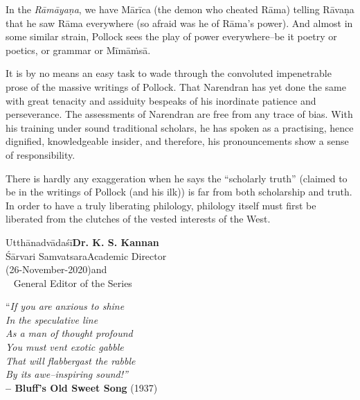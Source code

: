 In the \textit{Rāmāyaṇa}, we have Mārīca (the demon who cheated Rāma) telling Rāvaṇa that he saw Rāma everywhere (so afraid was he of Rāma’s power). And almost in some similar strain, Pollock sees the play of power everywhere–be it poetry or poetics, or grammar or Mīmāṁsā.

It is by no means an easy task to wade through the convoluted impenetrable prose of the massive writings of Pollock. That Narendran has yet done the same with great tenacity and assiduity bespeaks of his inordinate patience and perseverance. The assessments of Narendran are free from any trace of bias. With his training under sound traditional scholars, he has spoken as a practising, hence dignified, knowledgeable insider, and therefore, his pronouncements show a sense of responsibility.

There is hardly any exaggeration when he says the “scholarly truth” (claimed to be in the writings of Pollock (and his ilk)) is far from both scholarship and truth. In order to have a truly liberating philology, philology itself must first be liberated from the clutches of the vested interests of the West.

Utthānadvādaśī\hfill \textbf{Dr. K. S. Kannan}\\
Śārvari Samvatsara\hfill Academic Director\\
(26-November-2020)\hfill and\\
\phantom{a}~ \hfill General Editor of the Series



\delimiter

\vspace{3cm}

\begin{center}
“\textit{If you are anxious to shine\\ In the speculative line\\ As a man of thought profound\\ You must vent exotic gabble\\ That will flabbergast the rabble\\ By its awe–inspiring sound!”}\\\textbf{ – Bluff’s Old Sweet Song} (1937)
\end{center}

